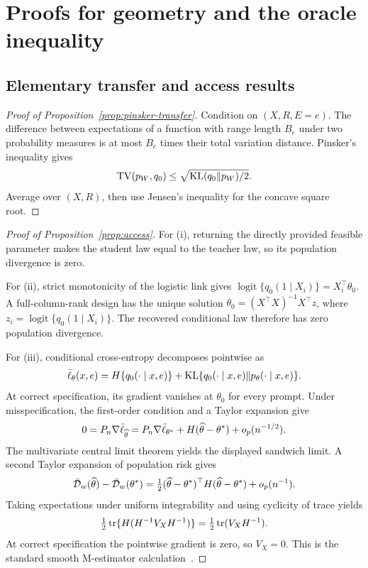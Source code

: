 \section{Proofs for geometry and the oracle inequality}
\label{app:oracle-proofs}

\subsection{Elementary transfer and access results}

\begin{proof}[Proof of Proposition~\ref{prop:pinsker-transfer}]
Condition on \((X,R,E=e)\). The difference between expectations of a function with range length \(B_e\) under two probability measures is at most \(B_e\) times their total variation distance. Pinsker's inequality gives
\[
\operatorname{TV}(p_W,q_0)\le\sqrt{\operatorname{KL}(q_0\|p_W)/2}.
\]
Average over \((X,R)\), then use Jensen's inequality for the concave square root.
\end{proof}

\begin{proof}[Proof of Proposition~\ref{prop:access}]
For (i), returning the directly provided feasible parameter makes the student law equal
to the teacher law, so its population divergence is zero.

For (ii), strict monotonicity of the logistic link gives
\(\operatorname{logit}\{q_0(1\mid X_i)\}=X_i^\top\theta_0\).  A full-column-rank
design has the unique solution
\(\theta_0=(X^\top X)^{-1}X^\top z\), where
\(z_i=\operatorname{logit}\{q_0(1\mid X_i)\}\).  The recovered conditional law
therefore has zero population divergence.

For (iii), conditional cross-entropy decomposes pointwise as
\[
\bar\ell_\theta(x,e)=H\{q_0(\cdot\mid x,e)\}
+\operatorname{KL}\{q_0(\cdot\mid x,e)\|p_\theta(\cdot\mid x,e)\}.
\]
At correct specification, its gradient vanishes at \(\theta_0\) for every
prompt.  Under misspecification, the first-order condition and a Taylor
expansion give
\[
0=P_n\nabla\bar\ell_{\widehat\theta}
=P_n\nabla\bar\ell_{\theta^*}
+H(\widehat\theta-\theta^*)+o_p(n^{-1/2}).
\]
The multivariate central limit theorem yields the displayed sandwich limit. A second Taylor expansion of population risk gives
\[
\bar{\mathcal D}_w(\widehat\theta)-\bar{\mathcal D}_w(\theta^*)
=\tfrac12(\widehat\theta-\theta^*)^\top H(\widehat\theta-\theta^*)
+o_p(n^{-1}).
\]
Taking expectations under uniform integrability and using cyclicity of trace yields
\[
\tfrac12\operatorname{tr}\{H(H^{-1}V_XH^{-1})\}
=\tfrac12\operatorname{tr}(V_XH^{-1}).
\]
At correct specification the pointwise gradient is zero, so \(V_X=0\). This is the standard smooth M-estimator calculation~\citep{vandervaart1998}.
\end{proof}


